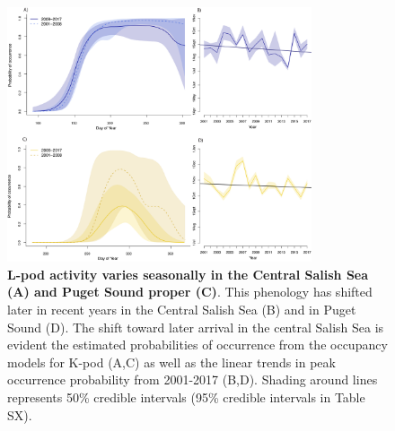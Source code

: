 \documentclass{article}
\begin{document}
\begin{figure}[p]
\includegraphics[width=0.8\textwidth]{../analyses/figures/proboccL_4panels.png} 
\caption{\textbf{L-pod activity varies seasonally in the Central Salish Sea (A) and Puget Sound proper (C)}. This phenology has shifted later in recent years in the Central Salish Sea (B) and in Puget Sound (D). The shift toward later arrival in the central Salish Sea is evident the estimated probabilities of occurrence from the occupancy models for K-pod (A,C) as well as the linear trends in peak occurrence probability from 2001-2017 (B,D). Shading around lines represents 50\% credible intervals (95\% credible intervals in Table SX). 
}
\label{fig:Lprobs}
\end{figure}
  
\end{document}
